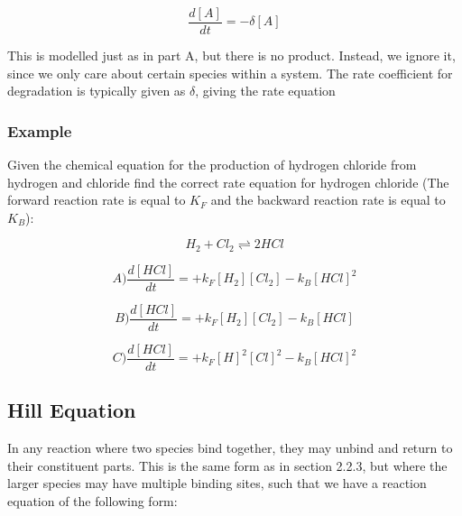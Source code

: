 \documentclass[11pt, letterpaper, english]{article}
\begin{document}
    \begin{equation}
        \frac{d [A]}{d t}=-\delta[A]
        \label{eq23}
    \end{equation}
    
    \par{This is modelled just as in part A, but there is no product. Instead, we ignore it, since we only care about certain species within a system. The rate coefficient for degradation is typically given as $\delta$, giving the rate equation}
    
    \subsubsection{Example}
    
    \par{Given the chemical equation for the production of hydrogen chloride from hydrogen and chloride find the correct rate equation for hydrogen chloride (The forward reaction rate is equal to $K_F$ and the backward reaction rate is equal to $K_B$): }
    
    \begin{equation}
        H_2+{Cl}_2 \rightleftharpoons 2HCl
    \end{equation}
    
    \vspace{2 cm}
    
    \begin{equation}
        A)\frac{d [HCl]}{d t}=+k_F[H_2][{Cl}_2]-k_B[HCl]^2
    \end{equation}

    \begin{equation}
        B)\frac{d [HCl]}{d t}=+k_F[H_2][{Cl}_2]-k_B[HCl]
    \end{equation}

    \begin{equation}
        C)\frac{d [HCl]}{d t}=+k_F{[H]}^2{[Cl]}^2-k_B[HCl]^2
    \end{equation}
    
    
\subsection{Hill Equation}
    
\par{In any reaction where two species bind together, they may unbind and return to their constituent parts. This is the same form as in section 2.2.3, but where the larger species may have multiple binding sites, such that we have a reaction equation of the following form:}
    
\end{document}
